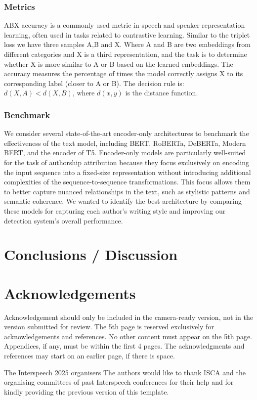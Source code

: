 \documentclass{Interspeech}
\begin{document}
\subsubsection{Metrics}
ABX accuracy is a commonly used metric in speech and speaker representation
learning, often used in tasks related to contrastive learning. Similar to the
triplet loss we have three samples A,B and X. Where A and B are two embeddings
from different categories and X is a third representation, and the task is to
determine whether X is more similar to A or B based on the learned embeddings.
The accuracy measures the percentage of times the model correctly assigns X to
its corresponding label (closer to A or B). The decision rule is: $d(X,A) <
  d(X,B)$, where $d(x,y)$ is the distance function. \\
\subsubsection{Benchmark} We consider several state-of-the-art encoder-only architectures to benchmark
the effectiveness of the text model, including BERT, RoBERTa, DeBERTa, Modern
BERT, and the encoder of T5. Encoder-only models are particularly well-suited
for the task of authorship attribution because they focus exclusively on
encoding the input sequence into a fixed-size representation without
introducing additional complexities of the sequence-to-sequence
transformations. This focus allows them to better capture nuanced relationships
in the text, such as stylistic patterns and semantic coherence. We wanted to
identify the best architecture by comparing these models for capturing each
author's writing style and improving our detection system's overall
performance.

\label{sec:experiments_results}

\section{Conclusions / Discussion}
\label{sec:conclusions}

\newpage
\ifinterspeechfinal
  \section{Acknowledgements}
  Acknowledgement should only be included in the camera-ready version, not in the
  version submitted for review. The 5th page is reserved exclusively for
  acknowledgements and references. No other content must appear on the 5th page.
  Appendices, if any, must be within the first 4 pages. The acknowledgments and
  references may start on an earlier page, if there is space.

  \ifinterspeechfinal
    The Interspeech 2025 organisers
  \else
    The authors
  \fi
  would like to thank ISCA and the organising committees of past Interspeech conferences for their help and for kindly providing the previous version of this template.
\fi



\end{document}
